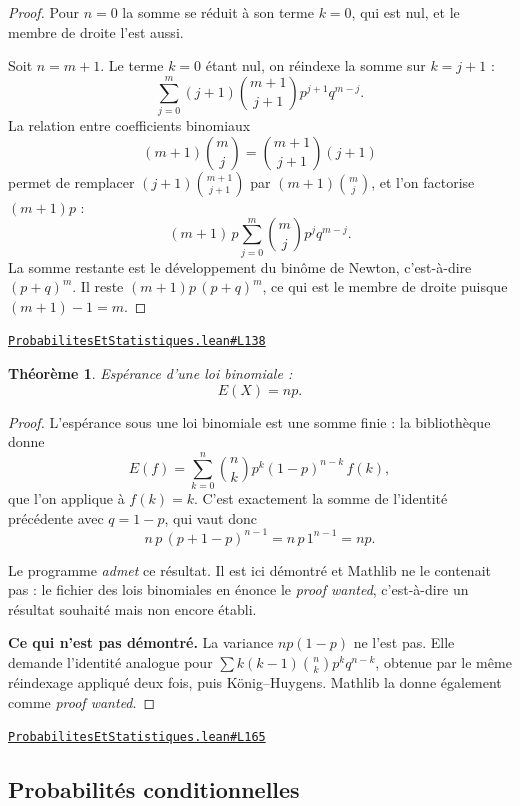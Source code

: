 \documentclass[11pt,a4paper]{article}
\theoremstyle{definition}
\theoremstyle{plain}
\newtheorem{theoreme}{Théorème}
\newcommand{\source}[2]{\par\smallskip\noindent\hfill{\footnotesize\href{#1}{\texttt{#2}}}\par\smallskip}
\begin{document}
\begin{proof}
Pour $n = 0$ la somme se réduit à son terme $k = 0$, qui est nul, et le membre de droite
l'est aussi.

Soit $n = m + 1$. Le terme $k = 0$ étant nul, on réindexe la somme sur $k = j + 1$ :
\[ \sum_{j=0}^{m} (j+1)\binom{m+1}{j+1} p^{j+1} q^{m-j} . \]
La relation entre coefficients binomiaux
\[ (m+1)\binom{m}{j} = \binom{m+1}{j+1}(j+1) \]
permet de remplacer $(j+1)\binom{m+1}{j+1}$ par $(m+1)\binom{m}{j}$, et l'on factorise
$(m+1)p$ :
\[ (m+1)\,p \sum_{j=0}^{m} \binom{m}{j} p^{j} q^{m-j} . \]
La somme restante est le développement du binôme de Newton, c'est-à-dire $(p+q)^{m}$. Il
reste $(m+1)p\,(p+q)^{m}$, ce qui est le membre de droite puisque $(m+1) - 1 = m$.
\end{proof}
\source{https://github.com/Commutator-IO/learn-lean/blob/main/cours/02-lycee/09-probabilites-et-statistiques/ProbabilitesEtStatistiques.lean\#L138}{ProbabilitesEtStatistiques.lean\#L138}

\begin{theoreme}
Espérance d'une loi binomiale :
\[ E(X) = np . \]
\end{theoreme}

\begin{proof}
L'espérance sous une loi binomiale est une somme finie : la bibliothèque donne
\[ E(f) = \sum_{k=0}^{n} \binom{n}{k} p^{k}(1-p)^{n-k}\, f(k) , \]
que l'on applique à $f(k) = k$. C'est exactement la somme de l'identité précédente avec
$q = 1 - p$, qui vaut donc
\[ n\,p\,(p + 1 - p)^{n-1} = n\,p\,1^{n-1} = np . \]

\medskip\noindent
Le programme \emph{admet} ce résultat. Il est ici démontré \textemdash{} et Mathlib ne le
contenait pas : le fichier des lois binomiales en énonce le \emph{proof wanted}, c'est-à-dire
un résultat souhaité mais non encore établi.

\medskip\noindent
\textbf{Ce qui n'est pas démontré.} La variance $np(1-p)$ ne l'est pas. Elle demande
l'identité analogue pour $\sum k(k-1)\binom{n}{k}p^{k}q^{n-k}$, obtenue par le même
réindexage appliqué deux fois, puis König--Huygens. Mathlib la donne également comme
\emph{proof wanted}.
\end{proof}
\source{https://github.com/Commutator-IO/learn-lean/blob/main/cours/02-lycee/09-probabilites-et-statistiques/ProbabilitesEtStatistiques.lean\#L165}{ProbabilitesEtStatistiques.lean\#L165}

\subsection{Probabilités conditionnelles}
\end{document}

